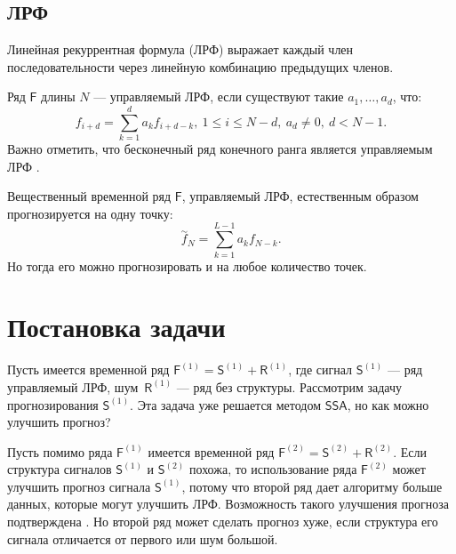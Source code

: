\documentclass[specialist, substylefile = spbureport.rtx,
    subf,href,colorlinks=true, 12pt]{disser}
\newcommand{\F}{\mathsf{F}}
\newcommand{\sfS}{\mathsf{S}}
\newcommand{\sfR}{\mathsf{R}}
\newcommand{\SSA}{\mathsf{SSA}}
\begin{document}
    \section{ЛРФ}
        Линейная рекуррентная формула (ЛРФ) выражает каждый член последовательности через линейную комбинацию предыдущих членов.

        Ряд $\F$ длины $N$ --- управляемый ЛРФ, если существуют такие $a_1, \dotso, a_d$, что:
        $$f_{i+d} = \sum_{k=1}^d a_k f_{i+d-k},\ 1 \leq i \leq N - d,\ a_d \neq 0,\ d < N - 1.$$
        Важно отметить, что бесконечный ряд конечного ранга является управляемым ЛРФ \cite[2.1.2.2, стр. 35]{SSA_with_R}.
        
        

        Вещественный временной ряд $\F$, управляемый ЛРФ, естественным образом прогнозируется на одну точку:
        $$\overset{\sim}{f}_{N} = \sum_{k=1}^{L-1} a_k f_{N-k}.$$
        Но тогда его можно прогнозировать и на любое количество точек.




    \chapter{Постановка задачи}

        Пусть имеется временной ряд $\F^{(1)} = \sfS^{(1)} + \sfR^{(1)}$, где сигнал $\sfS^{(1)}$ --- ряд управляемый ЛРФ, шум~$\sfR^{(1)}$ --- ряд без структуры. Рассмотрим задачу прогнозирования $\sfS^{(1)}$. Эта задача уже решается методом $\SSA$, но как можно улучшить прогноз?

        Пусть помимо ряда $\F^{(1)}$ имеется временной ряд $\F^{(2)} = \sfS^{(2)} + \sfR^{(2)}$.
        Если структура сигналов $\sfS^{(1)}$ и $\sfS^{(2)}$ похожа, то использование ряда $\F^{(2)}$ может улучшить прогноз сигнала $\sfS^{(1)}$, потому что второй ряд дает алгоритму больше данных, которые могут улучшить ЛРФ.
        Возможность такого улучшения прогноза подтверждена \cite[4.3.3.3, стр. 216]{SSA_with_R}.
        Но второй ряд может сделать прогноз хуже, если структура его сигнала отличается от первого или шум большой.
\end{document}
